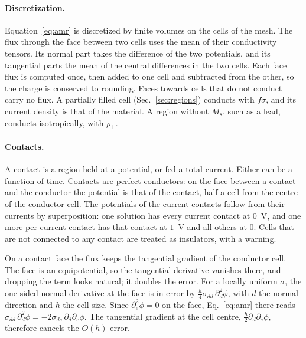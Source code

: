\documentclass{article}      %
\begin{document}
\paragraph{Discretization.}
Equation~\eqref{eq:amr} is discretized by finite volumes on the cells of the mesh.
The flux through the face between two cells uses the mean of their conductivity
tensors. Its normal part takes the difference of the two potentials, and its
tangential parts the mean of the central differences in the two cells. Each face
flux is computed once, then added to one cell and subtracted from the other, so the
charge is conserved to rounding. Faces towards cells that do not conduct carry no
flux. A partially filled cell (Sec.~\ref{sec:regions}) conducts with $f\sigma$, and
its current density is that of the material. A region without $M_s$, such as a lead,
conducts isotropically, with $\rho_\perp$.

\paragraph{Contacts.}
A contact is a region held at a potential, or fed a total current. Either can be a
function of time. Contacts are perfect conductors: on the face between a contact
and the conductor the potential is that of the contact, half a cell from the centre
of the conductor cell. The potentials of the current contacts follow from their
currents by superposition: one solution has every current contact at $0$~V, and one
more per current contact has that contact at $1$~V and all others at $0$. Cells that are not
connected to any contact are treated as insulators, with a warning.

On a contact face the flux keeps the tangential gradient of the conductor cell. The
face is an equipotential, so the tangential derivative vanishes there, and dropping
the term looks natural; it doubles the error. For a locally uniform $\sigma$, the
one-sided normal derivative at the face is in error by
$\tfrac{h}{4}\sigma_{dd}\,\partial_d^2\phi$, with $d$ the normal direction and $h$
the cell size. Since $\partial_e^2\phi=0$ on the face, Eq.~\eqref{eq:amr} there
reads $\sigma_{dd}\,\partial_d^2\phi = -2\sigma_{de}\,\partial_d\partial_e\phi$. The
tangential gradient at the cell centre, $\tfrac{h}{2}\partial_d\partial_e\phi$,
therefore cancels the $O(h)$ error.
\end{document}
